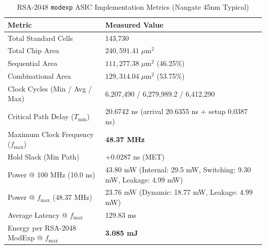 \documentclass[11pt,a4paper]{article}
\begin{document}
\begin{table}[h!]
\centering
\caption{RSA-2048 \texttt{modexp} ASIC Implementation Metrics (Nangate 45nm Typical)}
\small
\begin{tabular}{@{}lp{}@{}}
\toprule
\textbf{Metric} & \textbf{Measured Value} \\
\midrule
Total Standard Cells & 143,730 \\
Total Chip Area & $240,591.41\;\mu\text{m}^2$ \\
Sequential Area & $111,277.38\;\mu\text{m}^2$ (46.25\%) \\
Combinational Area & $129,314.04\;\mu\text{m}^2$ (53.75\%) \\
\midrule
Clock Cycles (Min / Avg / Max) & 6,207,490 / 6,279,989.2 / 6,412,290 \\
Critical Path Delay ($T_{\min}$) & 20.6742 ns (arrival 20.6355 ns + setup 0.0387 ns) \\
Maximum Clock Frequency ($f_{\max}$) & \textbf{48.37 MHz} \\
Hold Slack (Min Path) & +0.0287 ns (MET) \\
\midrule
Power @ 100 MHz (10.0 ns) & 43.80 mW (Internal: 29.5 mW, Switching: 9.30 mW, Leakage: 4.99 mW) \\
Power @ $f_{\max}$ (48.37 MHz) & 23.76 mW (Dynamic: 18.77 mW, Leakage: 4.99 mW) \\
Average Latency @ $f_{\max}$ & 129.83 ms \\
Energy per RSA-2048 ModExp @ $f_{\max}$ & \textbf{3.085 mJ} \\
\bottomrule
\end{tabular}
\end{table}
\end{document}
